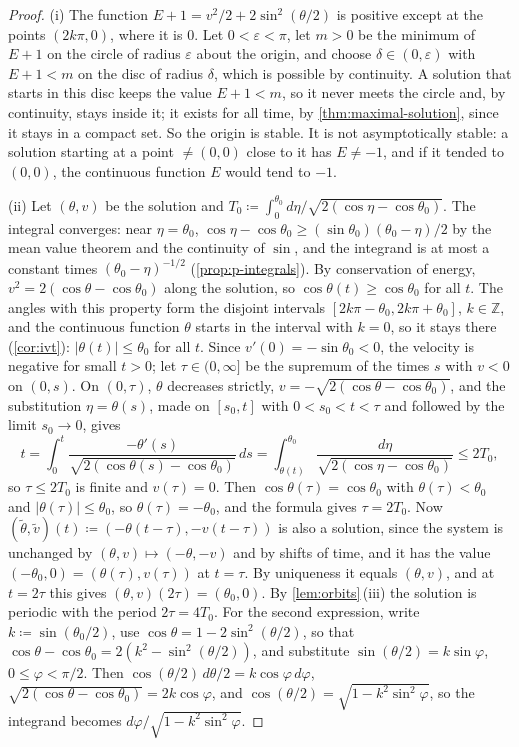 \begin{proof}
(i) The function $E+1=v^2/2+2\sin^2(\theta/2)$ is positive except at the points $(2k\pi,0)$, where it is $0$. Let $0<\varepsilon<\pi$, let $m>0$ be the minimum of $E+1$ on the circle of radius $\varepsilon$ about the origin, and choose $\delta\in(0,\varepsilon)$ with $E+1<m$ on the disc of radius $\delta$, which is possible by continuity. A solution that starts in this disc keeps the value $E+1<m$, so it never meets the circle and, by continuity, stays inside it; it exists for all time, by \cref{thm:maximal-solution}, since it stays in a compact set. So the origin is stable. It is not asymptotically stable: a solution starting at a point $\ne(0,0)$ close to it has $E\ne-1$, and if it tended to $(0,0)$, the continuous function $E$ would tend to $-1$.

(ii) Let $(\theta,v)$ be the solution and $T_0\coloneqq\int_0^{\theta_0}d\eta/\sqrt{2(\cos\eta-\cos\theta_0)}$. The integral converges: near $\eta=\theta_0$, $\cos\eta-\cos\theta_0\ge(\sin\theta_0)(\theta_0-\eta)/2$ by the mean value theorem and the continuity of $\sin$, and the integrand is at most a constant times $(\theta_0-\eta)^{-1/2}$ (\cref{prop:p-integrals}). By conservation of energy, $v^2=2(\cos\theta-\cos\theta_0)$ along the solution, so $\cos\theta(t)\ge\cos\theta_0$ for all $t$. The angles with this property form the disjoint intervals $[2k\pi-\theta_0,2k\pi+\theta_0]$, $k\in\mathbb Z$, and the continuous function $\theta$ starts in the interval with $k=0$, so it stays there (\cref{cor:ivt}): $|\theta(t)|\le\theta_0$ for all $t$. Since $v'(0)=-\sin\theta_0<0$, the velocity is negative for small $t>0$; let $\tau\in(0,\infty]$ be the supremum of the times $s$ with $v<0$ on $(0,s)$. On $(0,\tau)$, $\theta$ decreases strictly, $v=-\sqrt{2(\cos\theta-\cos\theta_0)}$, and the substitution $\eta=\theta(s)$, made on $[s_0,t]$ with $0<s_0<t<\tau$ and followed by the limit $s_0\to0$, gives
\[
t=\int_0^t\frac{-\theta'(s)}{\sqrt{2(\cos\theta(s)-\cos\theta_0)}}\,ds=\int_{\theta(t)}^{\theta_0}\frac{d\eta}{\sqrt{2(\cos\eta-\cos\theta_0)}}\le2T_0 ,
\]
so $\tau\le2T_0$ is finite and $v(\tau)=0$. Then $\cos\theta(\tau)=\cos\theta_0$ with $\theta(\tau)<\theta_0$ and $|\theta(\tau)|\le\theta_0$, so $\theta(\tau)=-\theta_0$, and the formula gives $\tau=2T_0$. Now $(\tilde\theta,\tilde v)(t)\coloneqq(-\theta(t-\tau),-v(t-\tau))$ is also a solution, since the system is unchanged by $(\theta,v)\mapsto(-\theta,-v)$ and by shifts of time, and it has the value $(-\theta_0,0)=(\theta(\tau),v(\tau))$ at $t=\tau$. By uniqueness it equals $(\theta,v)$, and at $t=2\tau$ this gives $(\theta,v)(2\tau)=(\theta_0,0)$. By \cref{lem:orbits}\,(iii) the solution is periodic with the period $2\tau=4T_0$. For the second expression, write $k\coloneqq\sin(\theta_0/2)$, use $\cos\theta=1-2\sin^2(\theta/2)$, so that $\cos\theta-\cos\theta_0=2(k^2-\sin^2(\theta/2))$, and substitute $\sin(\theta/2)=k\sin\varphi$, $0\le\varphi<\pi/2$. Then $\cos(\theta/2)\,d\theta/2=k\cos\varphi\,d\varphi$, $\sqrt{2(\cos\theta-\cos\theta_0)}=2k\cos\varphi$, and $\cos(\theta/2)=\sqrt{1-k^2\sin^2\varphi}$, so the integrand becomes $d\varphi/\sqrt{1-k^2\sin^2\varphi}$.


\end{proof}
